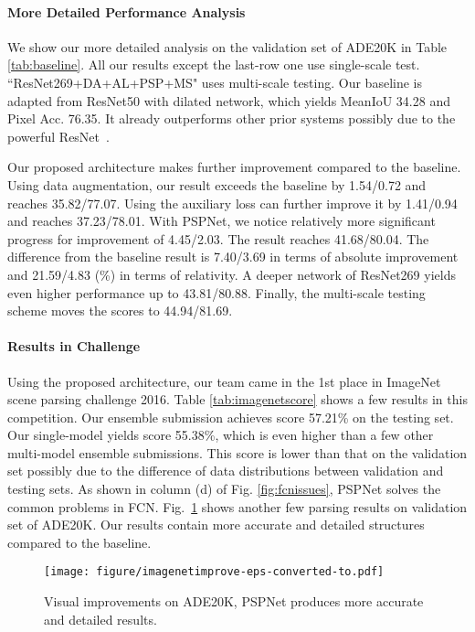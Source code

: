 \documentclass[10pt,twocolumn,letterpaper]{article}
\begin{document}
\vspace{-0.1in}
\paragraph{More Detailed Performance Analysis}
We show our more detailed analysis on the validation set of ADE20K in Table
\ref{tab:baseline}. All our results except the last-row one use single-scale test.
``ResNet269+DA+AL+PSP+MS" uses multi-scale testing. Our baseline is adapted from
ResNet50 with dilated network, which yields MeanIoU 34.28 and Pixel Acc. 76.35. It
already outperforms other prior systems possibly due to the powerful
ResNet~\cite{he2015deep}.

Our proposed architecture makes further improvement compared to the baseline. Using data
augmentation, our result exceeds the baseline by 1.54/0.72 and reaches 35.82/77.07. Using
the auxiliary loss can further improve it by 1.41/0.94 and reaches 37.23/78.01. With
PSPNet, we notice relatively more significant progress for improvement of 4.45/2.03. The
result reaches 41.68/80.04. The difference from the baseline result is 7.40/3.69 in terms
of absolute improvement and 21.59/4.83 (\%) in terms of relativity. A deeper network of
ResNet269 yields even higher performance up to 43.81/80.88. Finally, the multi-scale
testing scheme moves the scores to 44.94/81.69.

\vspace{-0.1in}
\paragraph{Results in Challenge}
Using the proposed architecture, our team came in {the 1st place} in ImageNet scene
parsing challenge 2016. Table \ref{tab:imagenetscore} shows a few results in this competition.
Our ensemble submission achieves score 57.21\% on the testing set. Our single-model yields
score 55.38\%, which is even higher than a few other multi-model ensemble submissions.
This score is lower than that on the validation set possibly due to the difference of
data distributions between validation and testing sets. As shown in column (d) of Fig.
\ref{fig:fcnissues}, PSPNet solves the common problems in FCN.
Fig.~\ref{fig:imagenetimprove} shows another few parsing results on validation set of
ADE20K. Our results contain more accurate and detailed structures compared to the
baseline.

\begin{figure}
\begin{center}
\texttt{[image: figure/imagenetimprove-eps-converted-to.pdf]}
\end{center}
\caption{Visual improvements on ADE20K, PSPNet produces more accurate and detailed
results.} \label{fig:imagenetimprove}
\end{figure}
\end{document}
